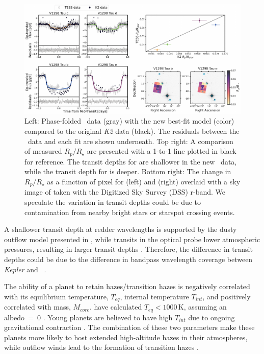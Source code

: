 \documentclass[linenumbers,modern,twocolumn]{aastex631}
\begin{document}
\begin{figure}[!htb]
\begin{center}
\includegraphics[width=\textwidth,trim={0.25cm 0 0 0}]{static/combined_together.pdf}
\caption{Left: Phase-folded \tess\ data (gray) with the new best-fit model (color) compared to the original \textit{K2} data (black). The residuals between the \tess\ data and each fit are shown underneath. Top right: A comparison of measured $R_p/R_\star$ are presented with a 1-to-1 line plotted in black for reference. The transit depths for \planetknown are shallower in the new \tess\ data, while the transit depth for \planete is deeper. Bottom right: The change in $R_p/R_\star$ as a function of pixel for \planetb (left) and \planete (right) overlaid with a sky image of \sname taken with the Digitized Sky Survey (DSS) r-band. We speculate the variation in transit depths could be due to contamination from nearby bright stars or starspot crossing events. \href{https://github.com/afeinstein20/v1298tau_tess/blob/main/src/figures/dilution_check.py}{\github}} \label{fig:compare}
\end{center}
\end{figure}

A shallower transit depth at redder wavelengths is supported by the dusty outflow model presented in \citep{wang19}, while transits in the optical probe lower atmospheric pressures, resulting in larger transit depths \citep{gao20}. Therefore, the difference in transit depths could be due to the difference in bandpass wavelength coverage between \textit{Kepler} \citep[400-900~nm;][]{Howell2014} and \tess\ \citep[600-1000~nm;][]{Ricker2015}. 

The ability of a planet to retain hazes/transition hazes is negatively correlated with its equilibrium temperature, $T_{eq}$, internal temperature $T_{int}$, and positively correlated with mass, $M_{core}$. \allplanets have calculated $T_{eq} < 1000$\,K, assuming an albedo~=~0 \citep{David2019a}. Young planets are believed to have high $T_{int}$ due to ongoing gravitational contraction \citep{gu04}. The combination of these two parameters make these planets more likely to host extended high-altitude hazes in their atmospheres, while outflow winds lead to the formation of transition hazes \citep{gao20}. 
\end{document}
